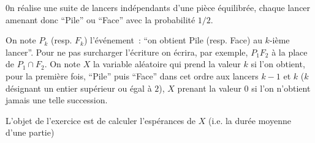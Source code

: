 \documentclass[a4paper]{tp_um}
\begin{document}
\exo{} 0n r\'ealise une suite de lancers ind\'ependants d'une pi\`ece \'equilibr\'ee, chaque
lancer amenant donc ``Pile'' ou ``Face'' avec la probabilit\'e $1/2$.

On note $P_k$ (resp. $F_k$) l'\'ev\'enement~: ``on obtient Pile (resp. Face) au
$k$-i\`eme lancer''. Pour ne pas surcharger l'\'ecriture on \'ecrira, par exemple,
$P_1 F_2$ \`a la place de $P_1\cap F_2$.
On note $X$ la variable al\'eatoire qui prend la valeur $k$ si l'on obtient, pour
la premi\`ere fois, ``Pile'' puis ``Face'' dans cet ordre aux lancers $k-1$ et
$k$ ($k$ d\'esignant un entier sup\'erieur ou \'egal \`a $2$), $X$ prenant la valeur
$0$ si l'on n'obtient jamais une telle succession.

%
L'objet de l'exercice est de calculer l'esp\'erances de $X$ (i.e. la durée moyenne d'une partie)
\end{document}
